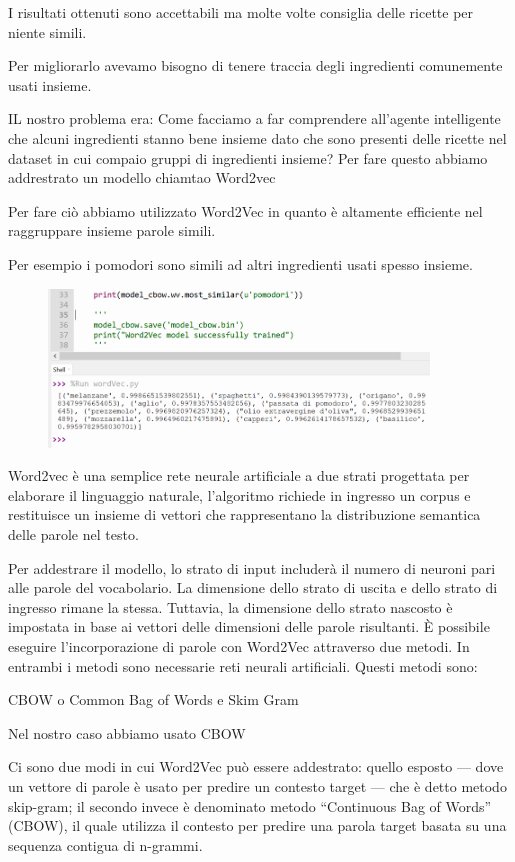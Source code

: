 \documentclass[12pt]{report}
\begin{document}
I risultati ottenuti sono accettabili ma molte volte consiglia delle ricette per niente simili.

Per migliorarlo avevamo bisogno di tenere traccia degli ingredienti comunemente usati insieme. 

IL nostro problema era: Come facciamo a far comprendere all’agente intelligente che alcuni ingredienti stanno bene insieme dato che sono presenti delle ricette nel dataset in cui compaio gruppi di ingredienti insieme?
Per fare questo abbiamo addrestrato un modello chiamtao Word2vec

Per fare ciò abbiamo utilizzato Word2Vec in quanto è  altamente efficiente nel raggruppare insieme parole simili.

Per esempio i pomodori sono simili ad altri ingredienti usati spesso insieme. 

\begin{figure}[H]
        \centering
        {\includegraphics[width=0.9\textwidth]{img/img13.jpg}}
\end{figure}

Word2vec è una semplice rete neurale artificiale a due strati progettata per elaborare il linguaggio naturale, l'algoritmo richiede in ingresso un corpus e restituisce un insieme di vettori che rappresentano la distribuzione semantica delle parole nel testo.

Per addestrare il modello, lo strato di input includerà il numero di neuroni pari alle parole del vocabolario. La dimensione dello strato di uscita e dello strato di ingresso rimane la stessa. Tuttavia, la dimensione dello strato nascosto è impostata in base ai vettori delle dimensioni delle parole risultanti. È possibile eseguire l’incorporazione di parole con Word2Vec attraverso due metodi. In entrambi i metodi sono necessarie reti neurali artificiali. Questi metodi sono:

CBOW o Common Bag of Words e Skim Gram

Nel nostro caso abbiamo usato CBOW

Ci sono due modi in cui Word2Vec può essere addestrato: quello esposto — dove un vettore di parole è usato per predire un contesto target — che è detto metodo skip-gram; il secondo invece è denominato metodo “Continuous Bag of Words” (CBOW), il quale utilizza il contesto per predire una parola target basata su una sequenza contigua di n-grammi.
\end{document}
